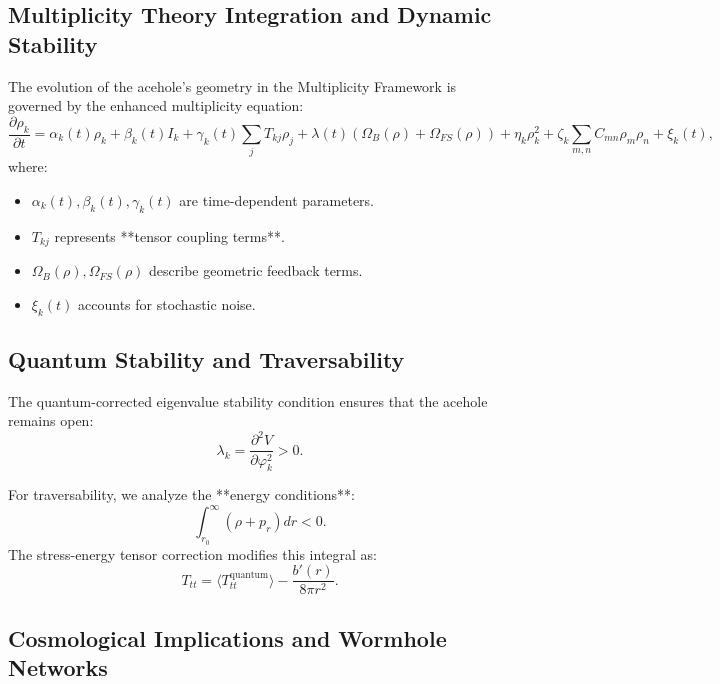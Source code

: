 \documentclass{article}
\theoremstyle{plain}
\begin{document}
\subsection{Multiplicity Theory Integration and Dynamic Stability}

The evolution of the acehole’s geometry in the Multiplicity Framework is governed by the enhanced multiplicity equation:
\begin{equation}
\frac{\partial \rho_k}{\partial t} = \alpha_k(t) \rho_k + \beta_k(t) I_k + \gamma_k(t) \sum_j T_{kj} \rho_j + \lambda(t) (\Omega_B(\rho) + \Omega_{FS}(\rho)) + \eta_k \rho_k^2 + \zeta_k \sum_{m,n} C_{mn} \rho_m \rho_n + \xi_k(t),
\end{equation}
where:
\begin{itemize}
    \item $\alpha_k(t), \beta_k(t), \gamma_k(t)$ are time-dependent parameters.
    \item $T_{kj}$ represents **tensor coupling terms**.
    \item $\Omega_B(\rho), \Omega_{FS}(\rho)$ describe geometric feedback terms.
    \item $\xi_k(t)$ accounts for stochastic noise.
\end{itemize}

\subsection{Quantum Stability and Traversability}

The quantum-corrected eigenvalue stability condition ensures that the acehole remains open:
\begin{equation}
\lambda_k = \frac{\partial^2 V}{\partial \varphi_k^2} > 0.
\end{equation}

For traversability, we analyze the **energy conditions**:
\begin{equation}
\int_{r_0}^{\infty} (\rho + p_r) dr < 0.
\end{equation}
The stress-energy tensor correction modifies this integral as:
\begin{equation}
T_{tt} = \langle T_{tt}^{\text{quantum}} \rangle - \frac{b'(r)}{8\pi r^2}.
\end{equation}

\subsection{Cosmological Implications and Wormhole Networks}
\end{document}
